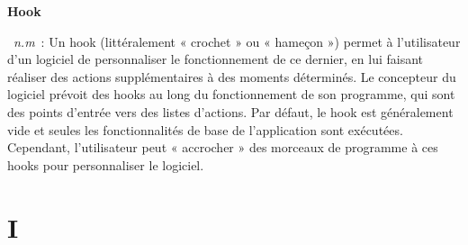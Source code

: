 \documentclass[10pt,a4paper,twoside]{article} %
\newcommand{\entry}[3]{\textbf{#1}\markboth{#1}{#1}\  \textit{#2}\ :  {#3}} %
\begin{document}
\begin{multicols}{2}

\entry{Hook}{n.m}{Un hook (littéralement « crochet » ou « hameçon ») permet à l'utilisateur d'un logiciel de personnaliser le fonctionnement de ce dernier, en lui faisant réaliser des actions supplémentaires à des moments déterminés. Le concepteur du logiciel prévoit des hooks au long du fonctionnement de son programme, qui sont des points d'entrée vers des listes d'actions. Par défaut, le hook est généralement vide et seules les fonctionnalités de base de l'application sont exécutées. Cependant, l'utilisateur peut « accrocher » des morceaux de programme à ces hooks pour personnaliser le logiciel.}

\end{multicols}


\section*{I}
\end{document}
